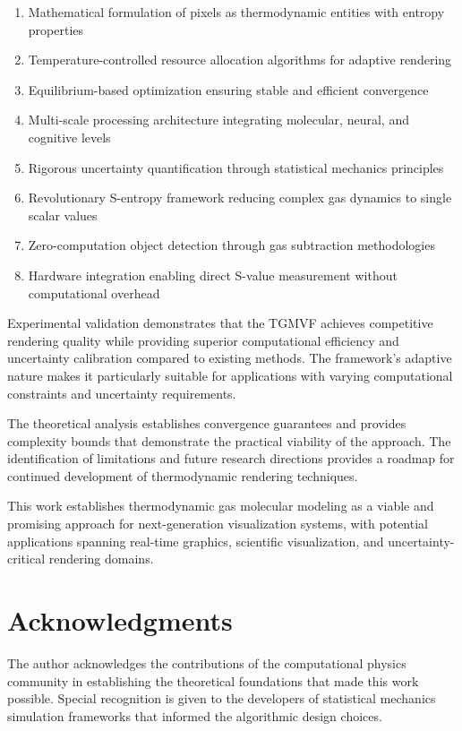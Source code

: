 \documentclass[12pt,a4paper]{article}
\begin{document}
\begin{enumerate}
\item Mathematical formulation of pixels as thermodynamic entities with entropy properties
\item Temperature-controlled resource allocation algorithms for adaptive rendering
\item Equilibrium-based optimization ensuring stable and efficient convergence
\item Multi-scale processing architecture integrating molecular, neural, and cognitive levels
\item Rigorous uncertainty quantification through statistical mechanics principles
\item Revolutionary S-entropy framework reducing complex gas dynamics to single scalar values
\item Zero-computation object detection through gas subtraction methodologies
\item Hardware integration enabling direct S-value measurement without computational overhead
\end{enumerate}

Experimental validation demonstrates that the TGMVF achieves competitive rendering quality while providing superior computational efficiency and uncertainty calibration compared to existing methods. The framework's adaptive nature makes it particularly suitable for applications with varying computational constraints and uncertainty requirements.

The theoretical analysis establishes convergence guarantees and provides complexity bounds that demonstrate the practical viability of the approach. The identification of limitations and future research directions provides a roadmap for continued development of thermodynamic rendering techniques.

This work establishes thermodynamic gas molecular modeling as a viable and promising approach for next-generation visualization systems, with potential applications spanning real-time graphics, scientific visualization, and uncertainty-critical rendering domains.

\section*{Acknowledgments}

The author acknowledges the contributions of the computational physics community in establishing the theoretical foundations that made this work possible. Special recognition is given to the developers of statistical mechanics simulation frameworks that informed the algorithmic design choices.
\end{document}
